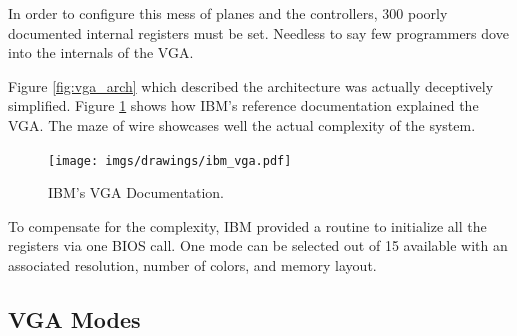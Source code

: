 \documentclass[book.tex]{subfiles}
\begin{document}
 

\par
In order to configure this mess of planes and the controllers, 300 poorly documented internal registers must be set. Needless to say few programmers dove into the internals of the VGA.\\
\par
  Figure \ref{fig:vga_arch} which described the architecture was actually deceptively simplified. Figure \ref{fig:ibm_vga} shows how IBM's reference documentation explained the VGA. The maze of wire showcases well the actual complexity of the system.\\
 \par
 \vspace{10pt}
 \begin{figure}[H]
\centering
\texttt{[image: imgs/drawings/ibm\_vga.pdf]}
\caption{IBM's VGA Documentation.}
\label{fig:ibm_vga}
\end{figure}

\bigskip



To compensate for the complexity, IBM provided a routine to initialize all the registers via one BIOS call. One mode can be selected out of 15 available with an associated resolution, number of colors, and memory layout.

\subsection{VGA Modes}
\end{document}
